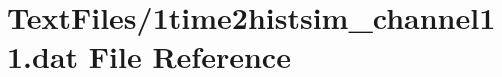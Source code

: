 \hypertarget{1time2histsim__channel11_8dat}{}\section{Text\+Files/1time2histsim\+\_\+channel11.dat File Reference}
\label{1time2histsim__channel11_8dat}
